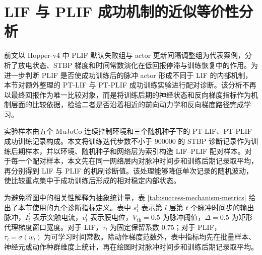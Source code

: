 \documentclass[UTF8,zihao=-4,oneside,openany]{ctexbook}
\begin{document}
\section{LIF 与 PLIF 成功机制的近似等价性分析}
前文以 Hopper-v4 中 PLIF 默认失败组与 actor 更新间隔调整组为代表案例，分析了放电状态、STBP 梯度和时间常数演化在低回报停滞与训练恢复中的作用。为进一步判断 PLIF 是否使成功训练后的脉冲 actor 形成不同于 LIF 的内部机制，本节对额外整理的 PT-LIF 与 PT-PLIF 成功训练实验进行配对诊断。该分析不再以最终回报作为唯一比较对象，而是将训练后期的神经状态和反向梯度指标作为机制层面的比较依据，检验二者是否沿着相近的前向动力学和反向梯度路径完成学习。

实验样本由五个 MuJoCo 连续控制环境和三个随机种子下的 PT-LIF、PT-PLIF 成功训练记录构成。本文将训练迭代步数不小于 $900000$ 的 STBP 诊断记录作为训练后期样本，并以环境、随机种子和网络层为索引构造 LIF--PLIF 配对样本。对于每一个配对样本，本文先在同一网络层内对脉冲时间步和训练后期记录取平均，再分别得到 LIF 与 PLIF 的机制诊断值。该处理能够降低单次记录的随机波动，使比较重点集中于成功训练后形成的相对稳定内部状态。

为避免将图中的相关性解释为抽象统计量，表 \ref{tab:success-mechanism-metrics} 给出了本节使用的九个诊断指标定义。表中 $s_t^l$ 表示第 $l$ 层第 $t$ 个脉冲时间步的输出脉冲，$I_t^l$ 表示突触电流，$v_t^l$ 表示膜电位，$V_{\mathrm{th}}=0.5$ 为脉冲阈值，$\Delta=0.5$ 为矩形代理梯度窗口宽度。对于 LIF，$\tau_l$ 为固定保留系数 $0.75$；对于 PLIF，$\tau_l=\sigma(w_l)$ 为可学习时间常数。除动作梯度范数外，表中指标均先在批量样本、神经元或动作种群维度上统计，再在绘图时对脉冲时间步和训练后期记录取平均。
\end{document}
